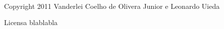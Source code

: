 \\[1cm]
\noindent Copyright 2011 Vanderlei Coelho de Olivera Junior e Leonardo Uieda

Licensa blablabla
